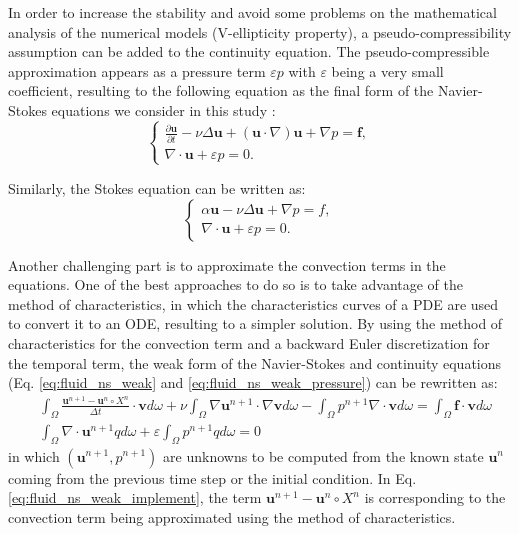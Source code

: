 In order to increase the stability and avoid some problems on the mathematical analysis of the numerical models (V-ellipticity
property), a pseudo-compressibility assumption can be added to the continuity equation. The pseudo-compressible approximation appears as a pressure term $\varepsilon p$ with $\varepsilon$ being a very small coefficient, resulting to the following equation as the final form of the Navier-Stokes equations we consider in this study \cite{devuyst2013}:
\begin{equation}  \label{eq:fluid_ns_pseudo}
\left\{ {\begin{array}{*{20}{l}}
\displaystyle  {\frac{{\partial {\mathbf{u}}}}{{\partial t}} - \nu\Delta{\mathbf{u}} + \left( {{\mathbf{u}} \cdot \nabla } \right) {\mathbf{u}} + \nabla p = {\mathbf{f}},} \\
 \displaystyle {\nabla\cdot{\mathbf{u}} + \varepsilon p = 0.}
\end{array}} \right.
\end{equation}

Similarly, the Stokes equation can be written as:
\begin{equation} \label{eq:fluid_stokes_pseudo}
\left\{ {\begin{array}{*{20}{l}}
\displaystyle  {\alpha \mathbf{u} - \nu\Delta \mathbf{u} + \nabla p = f,} \\
\displaystyle  {\nabla\cdot\mathbf{u} + \varepsilon p = 0.}
\end{array}} \right.
\end{equation}

Another challenging part is to approximate the convection terms in the equations. One of the best approaches to do so is to take advantage of the method of characteristics, in which the characteristics curves of a PDE are used to convert it to an ODE, resulting to a simpler solution. By using the method of characteristics for the convection term and a backward Euler discretization for the temporal term, the weak form of the Navier-Stokes and continuity equations (Eq. \ref{eq:fluid_ns_weak} and \ref{eq:fluid_ns_weak_pressure}) can be rewritten as:
\begin{equation} \label{eq:fluid_ns_weak_implement}
\begin{aligned}
&\int_{\Omega} \frac{\mathbf{u}^{n+1}-\mathbf{u}^{n} \circ X^{n}}{\Delta t} \cdot \mathbf{v} d \omega+\nu \int_{\Omega} \nabla \mathbf{u}^{n+1} \cdot \nabla \mathbf{v} d \omega-\int_{\Omega} p^{n+1} \nabla \cdot \mathbf{v} d \omega=\int_{\Omega} \boldsymbol{f} \cdot \mathbf{v} d\omega \\
&\int_{\Omega} \nabla \cdot \mathbf{u}^{n+1} q d \omega+\varepsilon \int_{\Omega} p^{n+1} q d \omega=0
\end{aligned}
\end{equation}
in which $(\mathbf{u}^{n+1},p^{n+1})$ are unknowns to be computed from the known state $\mathbf{u}^{n}$ coming from the previous time step or the initial condition. In Eq. \ref{eq:fluid_ns_weak_implement}, the term $\mathbf{u}^{n+1}-\mathbf{u}^{n} \circ X^{n}$ is corresponding to the convection term being approximated using the method of characteristics.

